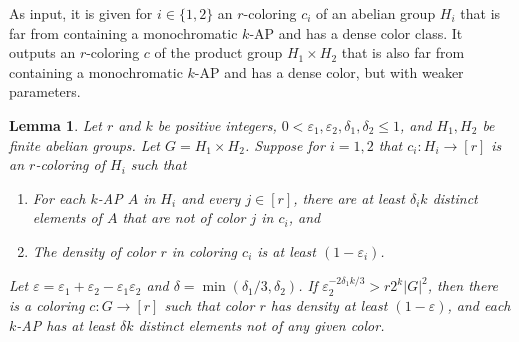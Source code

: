 \documentclass[11pt]{article}
\numberwithin{equation}{section}
\newtheorem{lem}[result]{Lemma}
\theoremstyle{definition}
\theoremstyle{remark}
\begin{document}
As input, it is given for $i \in \{1,2\}$ an $r$-coloring $c_i$ of an abelian group $H_i$ that is far from containing a monochromatic $k$-AP and has a dense color class. It outputs an $r$-coloring $c$ of the product group $H_1 \times H_2$ that is also far from containing a monochromatic $k$-AP and has a dense color, but with weaker parameters. 

\begin{lem}\label{productlemma}
Let $r$ and $k$ be positive integers, $0<\varepsilon_1,\varepsilon_2,\delta_1,\delta_2 \leq 1$, and $H_1,H_2$ be finite abelian groups. Let $G=H_1 \times H_2$. Suppose for $i=1,2$ that $c_i:H_i \to [r]$ is an $r$-coloring of $H_i$ such that 
\begin{enumerate} 
\item For each $k$-AP $A$ in $H_i$ and every $j \in [r]$, there are at least $\delta_i k$ distinct elements of $A$ that are not of color $j$ in $c_i$, and   
\item The density of color $r$ in coloring $c_i$ is at least $(1-\varepsilon_i)$. 
\end{enumerate}
Let $\varepsilon = \varepsilon_1+\varepsilon_2-\varepsilon_1\varepsilon_2$ and $\delta=\min(\delta_1/3,\delta_2)$.  If $\varepsilon_2^{-2\delta_1 k/3}>r2^k|G|^2$, then there is a coloring $c:G \rightarrow [r]$ such that color $r$ has density at least $(1-\varepsilon)$, and each $k$-AP has at least $\delta k$ distinct elements not of any given color.
\end{lem}
\end{document}
